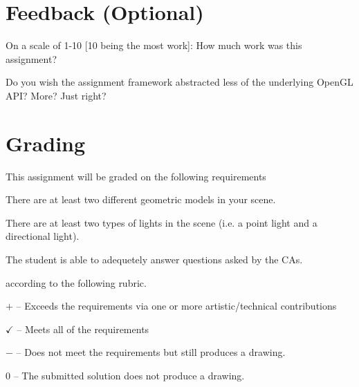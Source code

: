 \documentclass{article}
\begin{document}
\section*{Feedback (Optional)}
\begin{enumerate*}
    \item On a scale of 1-10 [10 being the most work]: How much work was this assignment?
    \item Do you wish the assignment framework abstracted less of the underlying OpenGL API? More? Just right?
\end{enumerate*}

\section*{Grading}
This assignment will be graded on the following requirements
\begin{itemize*}
    \item There are at least two different geometric models in your scene.
    \item There are at least two types of lights in the scene (i.e. a point light and a directional light).
    \item The student is able to adequetely answer questions asked by the CAs.
\end{itemize*}
according to the following rubric.
\begin{itemize*}
\item $+$ -- Exceeds the requirements via one or more artistic/technical contributions
\item $\checkmark$ -- Meets all of the requirements
\item $-$ -- Does not meet the requirements but still produces a drawing.
\item $0$ -- The submitted solution does not produce a drawing.
\end{itemize*}
\end{document}
